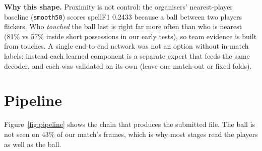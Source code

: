 \documentclass[10pt,a4paper]{article}
\newcommand{\code}[1]{\texttt{\small #1}}
\newcommand{\sF}{spellF1}
\begin{document}
\textbf{Why this shape.} Proximity is not control: the organisers' nearest-player baseline
(\code{smooth50}) scores \sF{} 0.2433 because a ball between two players flickers. Who \emph{touched}
the ball last is right far more often than who is nearest (81\% vs 57\% inside short possessions
in our early tests), so team evidence is built from touches. A single end-to-end network was
not an option without in-match labels; instead each learned component is a separate expert that
feeds the same decoder, and each was validated on its own (leave-one-match-out or fixed folds).

\section{Pipeline}

Figure~\ref{fig:pipeline} shows the chain that produces the submitted file. The ball is not seen
on 43\% of our match's frames, which is why most stages read the players as well as the ball.
\end{document}

